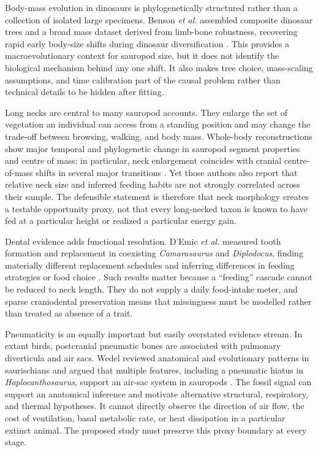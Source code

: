 \documentclass[conference]{IEEEtran}
\begin{document}
Body-mass evolution in dinosaurs is phylogenetically structured rather than a collection of isolated large specimens. Benson \emph{et al.} assembled composite dinosaur trees and a broad mass dataset derived from limb-bone robustness, recovering rapid early body-size shifts during dinosaur diversification \cite{benson2014}. This provides a macroevolutionary context for sauropod size, but it does not identify the biological mechanism behind any one shift. It also makes tree choice, mass-scaling assumptions, and time calibration part of the causal problem rather than technical details to be hidden after fitting.

Long necks are central to many sauropod accounts. They enlarge the set of vegetation an individual can access from a standing position and may change the trade-off between browsing, walking, and body mass. Whole-body reconstructions show major temporal and phylogenetic change in sauropod segment properties and centre of mass; in particular, neck enlargement coincides with cranial centre-of-mass shifts in several major transitions \cite{bates2016}. Yet those authors also report that relative neck size and inferred feeding habits are not strongly correlated across their sample. The defensible statement is therefore that neck morphology creates a testable opportunity proxy, not that every long-necked taxon is known to have fed at a particular height or realized a particular energy gain.

Dental evidence adds functional resolution. D'Emic \emph{et al.} measured tooth formation and replacement in coexisting \emph{Camarasaurus} and \emph{Diplodocus}, finding materially different replacement schedules and inferring differences in feeding strategies or food choice \cite{demic2013}. Such results matter because a ``feeding'' cascade cannot be reduced to neck length. They do not supply a daily food-intake meter, and sparse craniodental preservation means that missingness must be modelled rather than treated as absence of a trait.

Pneumaticity is an equally important but easily overstated evidence stream. In extant birds, postcranial pneumatic bones are associated with pulmonary diverticula and air sacs. Wedel reviewed anatomical and evolutionary patterns in saurischians and argued that multiple features, including a pneumatic hiatus in \emph{Haplocanthosaurus}, support an air-sac system in sauropods \cite{wedel2009}. The fossil signal can support an anatomical inference and motivate alternative structural, respiratory, and thermal hypotheses. It cannot directly observe the direction of air flow, the cost of ventilation, basal metabolic rate, or heat dissipation in a particular extinct animal. The proposed study must preserve this proxy boundary at every stage.
\end{document}

